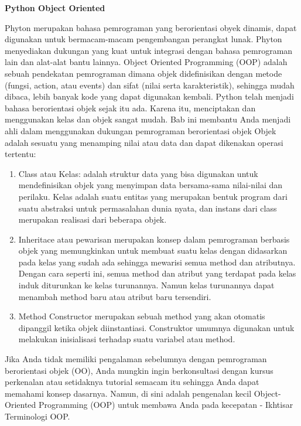 \sloppy
\begin{center}{\fontsize{16pt}{16pt}\selectfont \textbf{Python Object Oriented} \\}\end{center} \par
Phyton merupakan bahasa pemrograman yang berorientasi obyek dinamis, dapat digunakan untuk bermacam-macam pengembangan perangkat lunak. Phyton menyediakan dukungan yang kuat untuk integrasi dengan bahasa pemrograman lain dan alat-alat bantu lainnya.
Object Oriented Programming (OOP) adalah sebuah pendekatan pemrograman dimana objek didefinisikan dengan metode (fungsi, action, atau events) dan sifat (nilai serta karakteristik), sehingga mudah dibaca, lebih banyak kode yang dapat digunakan kembali.
Python telah menjadi bahasa berorientasi objek sejak itu ada. Karena itu, menciptakan dan menggunakan kelas dan objek sangat mudah. Bab ini membantu Anda menjadi ahli dalam menggunakan dukungan pemrograman berorientasi objek
Objek adalah sesuatu yang menamping nilai atau data dan dapat dikenakan operasi tertentu:
\begin {enumerate}
\item Class atau Kelas: adalah struktur data yang bisa digunakan untuk mendefinisikan objek yang menyimpan data bersama-sama nilai-nilai dan perilaku. Kelas adalah suatu entitas yang merupakan bentuk program dari suatu abstraksi untuk permasalahan dunia nyata, dan instans dari class merupakan realisasi dari beberapa objek.
\item Inheritace atau pewarisan merupakan konsep dalam pemrograman berbasis objek yang memungkinkan untuk membuat suatu kelas dengan didasarkan pada kelas yang sudah ada sehingga mewarisi semua method dan atributnya. Dengan cara seperti ini, semua method dan atribut yang terdapat pada kelas induk diturunkan ke kelas turunannya. Namun kelas turunannya dapat menambah method baru atau atribut baru tersendiri.
\item Method Constructor merupakan sebuah method yang akan otomatis dipanggil ketika objek diinstantiasi. Construktor umumnya digunakan untuk melakukan inisialisasi terhadap suatu variabel atau method.
\end {enumerate} 

Jika Anda tidak memiliki pengalaman sebelumnya dengan pemrograman berorientasi objek (OO), Anda mungkin  ingin berkonsultasi dengan kursus perkenalan atau setidaknya tutorial semacam itu sehingga Anda dapat memahami konsep dasarnya. Namun, di sini adalah pengenalan kecil Object-Oriented Programming (OOP) untuk membawa Anda pada kecepatan - Ikhtisar Terminologi OOP. 

